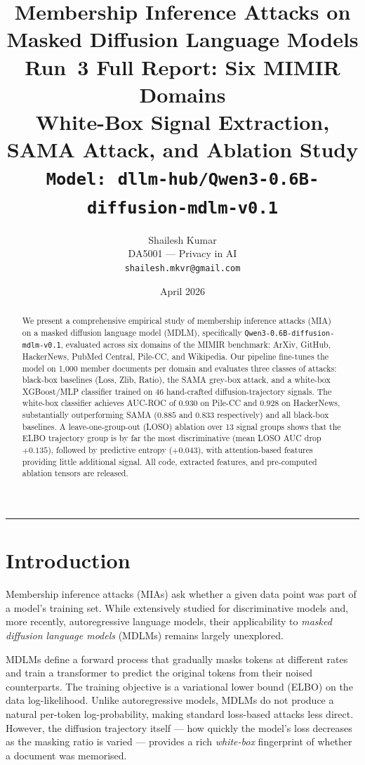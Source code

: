 \documentclass[11pt,a4paper]{article}
\title{%
  \textbf{Membership Inference Attacks on\\
  Masked Diffusion Language Models}\\[6pt]
  \large Run~3 Full Report: Six MIMIR Domains\\[4pt]
  \normalsize White-Box Signal Extraction, SAMA Attack, and Ablation Study\\[6pt]
  \texttt{Model:}~\texttt{dllm-hub/Qwen3-0.6B-diffusion-mdlm-v0.1}
}
\author{Shailesh Kumar\\
  \small DA5001 — Privacy in AI\\
  \small \texttt{shailesh.mkvr@gmail.com}
}
\date{April 2026}
\begin{document}
\maketitle

\begin{abstract}
We present a comprehensive empirical study of membership inference attacks (MIA)
on a masked diffusion language model (MDLM), specifically
\texttt{Qwen3-0.6B-diffusion-mdlm-v0.1}, evaluated across six domains of the
MIMIR benchmark: ArXiv, GitHub, HackerNews, PubMed Central, Pile-CC, and Wikipedia.
Our pipeline fine-tunes the model on 1{,}000 member documents per domain and
evaluates three classes of attacks: black-box baselines (Loss, Zlib, Ratio),
the SAMA grey-box attack, and a white-box XGBoost/MLP classifier trained on
46 hand-crafted diffusion-trajectory signals.
The white-box classifier achieves AUC-ROC of $0.930$ on Pile-CC and $0.928$
on HackerNews, substantially outperforming SAMA ($0.885$ and $0.833$
respectively) and all black-box baselines.
A leave-one-group-out (LOSO) ablation over 13 signal groups shows that the
ELBO trajectory group is by far the most discriminative (mean LOSO AUC drop
$+0.135$), followed by predictive entropy ($+0.043$), with attention-based
features providing little additional signal.
All code, extracted features, and pre-computed ablation tensors are released.
\end{abstract}

\tableofcontents
\vspace{1em}
\hrule
\vspace{1em}

\section{Introduction}

Membership inference attacks (MIAs) ask whether a given data point was part of a
model's training set. While extensively studied for discriminative models and,
more recently, autoregressive language models, their applicability to
\emph{masked diffusion language models} (MDLMs) remains largely unexplored.

MDLMs define a forward process that gradually masks tokens at different rates
and train a transformer to predict the original tokens from their noised
counterparts. The training objective is a variational lower bound (ELBO) on
the data log-likelihood. Unlike autoregressive models, MDLMs do not produce a
natural per-token log-probability, making standard loss-based attacks less
direct. However, the diffusion trajectory itself --- how quickly the model's
loss decreases as the masking ratio is varied --- provides a rich
\emph{white-box} fingerprint of whether a document was memorised.
\end{document}
